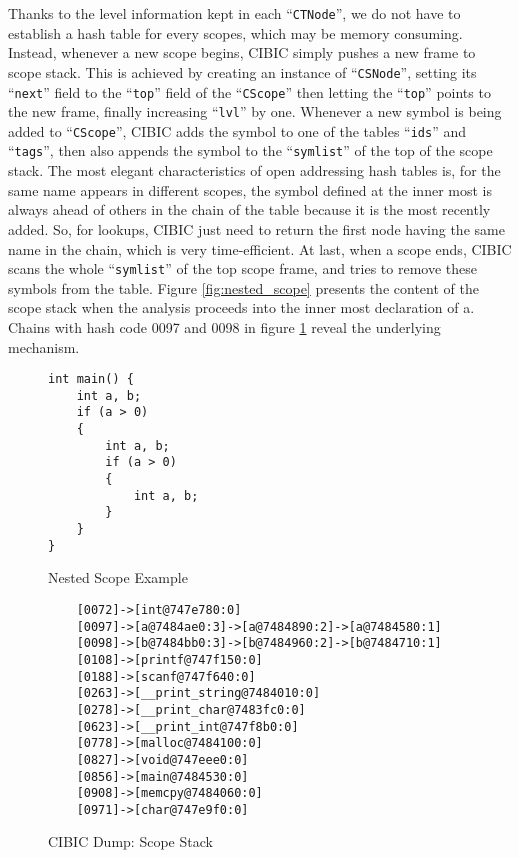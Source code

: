 \documentclass[10pt, a4paper]{article}
\begin{document}
Thanks to the level information kept in each ``\texttt{CTNode}'', we do not
have to establish a hash table for every scopes, which may be memory consuming.
Instead, whenever a new scope begins, CIBIC simply pushes a new frame to scope
stack. This is achieved by creating an instance of ``\texttt{CSNode}'', setting
its ``\texttt{next}'' field to the ``\texttt{top}'' field of the
``\texttt{CScope}'' then letting the ``\texttt{top}'' points to the new frame,
finally increasing ``\texttt{lvl}'' by one. Whenever a new symbol is being
added to ``\texttt{CScope}'', CIBIC adds the symbol to one of the tables
``\texttt{ids}'' and ``\texttt{tags}'', then also appends the symbol to the
``\texttt{symlist}'' of the top of the scope stack. The most elegant
characteristics of open addressing hash tables is, for the same name appears in
different scopes, the symbol defined at the inner most is always ahead of
others in the chain of the table because it is the most recently added. So,
for lookups, CIBIC just need to return the first node having the same name in
the chain, which is very time-efficient. At last, when a scope ends, CIBIC
scans the whole ``\texttt{symlist}'' of the top scope frame, and tries to remove
these symbols from the table. Figure \ref{fig:nested_scope} presents the content
of the scope stack when the analysis proceeds into the inner most declaration of
a. Chains with hash code 0097 and 0098 in figure \ref{fig:scope_stack} reveal
the underlying mechanism.
\begin{figure}[H]
    \begin{minipage}{0.35\textwidth}
    \begin{verbatim}
int main() {
    int a, b;
    if (a > 0)
    {
        int a, b;
        if (a > 0)
        {
            int a, b;
        }
    }
}
    \end{verbatim}
    \caption {Nested Scope Example}
    \label{fig:nested_scope}
\end{minipage}
    \begin{minipage}{0.5\textwidth}
    \begin{BVerbatim}
    [0072]->[int@747e780:0]
    [0097]->[a@7484ae0:3]->[a@7484890:2]->[a@7484580:1]
    [0098]->[b@7484bb0:3]->[b@7484960:2]->[b@7484710:1]
    [0108]->[printf@747f150:0]
    [0188]->[scanf@747f640:0]
    [0263]->[__print_string@7484010:0]
    [0278]->[__print_char@7483fc0:0]
    [0623]->[__print_int@747f8b0:0]
    [0778]->[malloc@7484100:0]
    [0827]->[void@747eee0:0]
    [0856]->[main@7484530:0]
    [0908]->[memcpy@7484060:0]
    [0971]->[char@747e9f0:0]
    \end{BVerbatim}
    \caption {CIBIC Dump: Scope Stack}
    \label{fig:scope_stack}
\end{minipage}
\end{figure}
\end{document}

